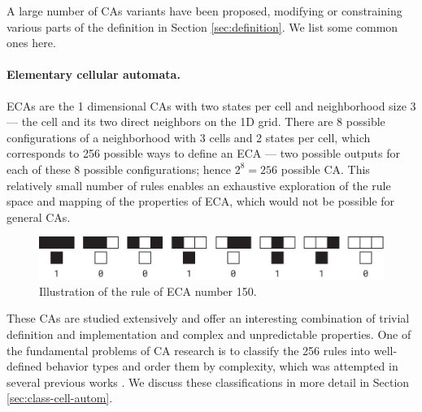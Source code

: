 A large number of \acp{CA} variants have been proposed, modifying or
constraining various parts of the definition in Section \ref{sec:definition}.
We list some common ones here.

\paragraph{Elementary cellular automata.\label{sec:elem-cell-autom}}
\Acp{ECA} are the 1 dimensional \acp{CA} with two states per cell and
neighborhood size 3 --- the cell and its two direct neighbors on the 1D grid.
There are 8 possible configurations of a neighborhood with 3 cells and 2 states
per cell, which corresponds to 256 possible ways to define an \ac{ECA} --- two
possible outputs for each of these 8 possible configurations; hence
$2^{8} = 256$ possible \ac{CA}. This relatively small number of rules enables an
exhaustive exploration of the rule space and mapping of the properties of \ac{ECA},
which would not be possible for general \acp{CA}.

\begin{figure}[htbp]
  \centering
  \includegraphics[width=.95\linewidth]{figures/eca_150_rule}
  \caption{Illustration of the rule of \ac{ECA} number 150.}
  \label{fig:eca_150_rule}
\end{figure}

These \acp{CA} are studied extensively and offer an interesting combination of
trivial definition and implementation and complex and unpredictable properties.
One of the fundamental problems of \ac{CA} research is to classify the 256 rules
into well-defined behavior types and order them by complexity, which was
attempted in several previous works
\parencite{wuenscheGlobalDynamicsCellular1992,
  gutowitzTransientsCyclesComplexity1991,
  wuenscheClassifyingCellularAutomata1999, wolframNewKindScience2002,
  zenilCompressionBasedInvestigationDynamical2010,
  hudcovaClassificationComplexSystems2020,
  hudcovaComputationalHierarchyElementary2021}. We discuss these classifications
in more detail in Section \ref{sec:class-cell-autom}.

